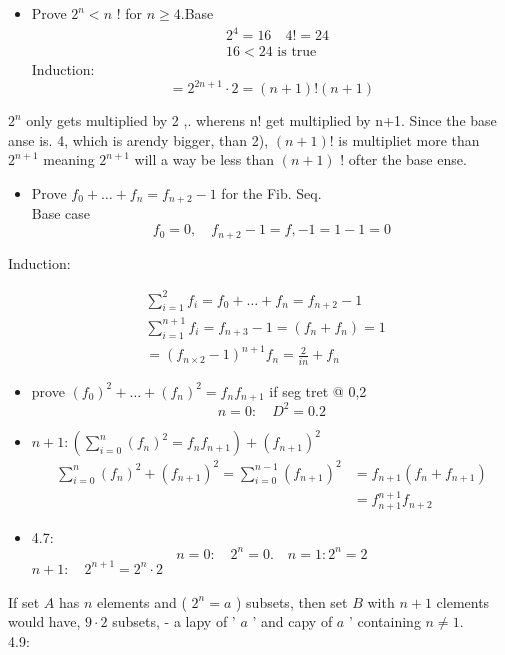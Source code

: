 \documentclass[10pt]{article}
\begin{document}
\begin{itemize}
  \item[4.1:] Prove $2^{n}<n$ ! for $n \geq 4$.Base
$$
\begin{aligned}
& 2^{4}=16 \quad 4!=24 \\
& 16<24 \text { is true }
\end{aligned}
$$
Induction:
$$
=2^{2 n+1} \cdot 2=(n+1)!(n+1)
$$
\end{itemize}

$2^{n}$ only gets multiplied by 2 ,. wherens n! get multiplied by n+1. Since the base anse is. 4, which is arendy bigger, than 2), $(n+1)!$ is multipliet more than $2^{n+1}$ meaning $2^{n+1}$ will a way be less than $(n+1)$ ! ofter the base ense.

\begin{itemize}
  \item[43:] Prove $f_{0}+\ldots+f_{n}=f_{n+2}-1$ for the Fib. Seq.\\
Base case
$$
f_{0}=0, \quad f_{n+2}-1=f,-1=1-1=0
$$
\end{itemize}

Induction:

$$
\begin{aligned}
& \sum_{i=1}^{2} f_{i}=f_{0}+\ldots+f_{n}=f_{n+2}-1 \\
& \sum_{i=1}^{n+1} f_{i}=f_{n+3}-1=\left(f_{n}+f_{n}\right)=1 \\
& =\left(f_{n \times 2}-1\right)^{n+1} f_{n}=\frac{2}{i n}+f_{n}
\end{aligned}
$$

\begin{itemize}
  \item[4.5:] prove $\left(f_{0}\right)^{2}+\ldots+\left(f_{n}\right)^{2}=f_{n} f_{n+1}$ if seg tret @ 0,2
$$
n=0: \quad D^{2}=0.2
$$
  \item[] $n+1:\left(\sum_{i=0}^{n}\left(f_{n}\right)^{2}=f_{n} f_{n+1}\right)+\left(f_{n+1}\right)^{2}$
$$
\begin{aligned}
\sum_{i=0}^{n}\left(f_{n}\right)^{2}+\left(f_{n+1}\right)^{2}=\sum_{i=0}^{n-1}\left(f_{n+1}\right)^{2} & =f_{n+1}\left(f_{n}+f_{n+1}\right) \\
& =f_{n+1}^{n+1} f_{n+2}
\end{aligned}
$$
  \item[] 4.7:
$$
n=0: \quad 2^{n}=0 . \quad n=1: 2^{n}=2
$$
$n+1: \quad 2^{n+1}=2^{n} \cdot 2$
\end{itemize}

If set $A$ has $n$ elements and ( $2^{n}=a$ ) subsets, then set $B$ with $n+1$ clements would have, $9 \cdot 2$ subsets, - a lapy of ' $a$ ' and capy of $a$ ' containing $n \neq 1$.\\
4.9:
\end{document}

